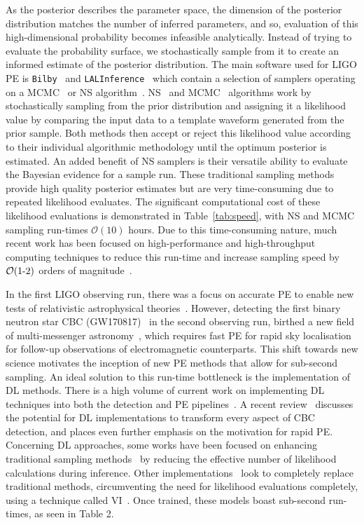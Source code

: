 \documentclass[a4paper]{jpconf}
\begin{document}
As the posterior describes the parameter space, the dimension of the posterior distribution matches the number of inferred parameters, and so, evaluation of this high-dimensional probability becomes infeasible analytically. Instead of trying to evaluate the probability surface, we stochastically sample from it to create an informed estimate of the posterior distribution. The main software used for LIGO PE is \texttt{Bilby}~\cite{bilby} and \texttt{LALInference}~\cite{lalinference} which contain a selection of samplers operating on a \ac{MCMC}~\cite{emcee,ptemcee} or \ac{NS} algorithm~\cite{dynesty,cpnest}. NS~\cite{Skilling2004} and MCMC~\cite{Metropolis1953,Hastings1970,Hogg} algorithms work by stochastically sampling from the prior distribution and assigning it a likelihood value by comparing the input data to a template waveform generated from the prior sample. Both methods then accept or reject this likelihood value according to their individual algorithmic methodology until the optimum posterior is estimated. An added benefit of NS samplers is their versatile ability to evaluate the Bayesian evidence for a sample run. These traditional sampling methods provide high quality posterior estimates but are very time-consuming due to repeated likelihood evaluates. The significant computational cost of these likelihood evaluations is demonstrated in Table~\ref{tab:speed}, with NS and MCMC sampling run-times $\mathcal{O}(10)$ hours. Due to this time-consuming nature, much recent work has been focused on high-performance and high-throughput computing techniques to reduce this run-time and increase sampling speed by $\mathcal{O}(1\textup{-}2)$ orders of magnitude~\cite{smith,purrer,gpu_inference,gpu_rit,2016PhRvD..94d4031S,2019PhRvD..99h4026W,2019PhRvD.100d3030T}. 

In the first LIGO observing run, there was a focus on accurate PE to enable new tests of relativistic astrophysical theories~\cite{GW170817_Hubble,GW150914_gr,Schutz}. However, detecting the first binary neutron star CBC (GW170817)~\cite{GW170817_properties} in the second observing run, birthed a new field of multi-messenger astronomy~\cite{GW170817_mma}, which requires fast PE for rapid sky localisation for follow-up observations of electromagnetic counterparts. This shift towards new science motivates the inception of new PE methods that allow for sub-second sampling. An ideal solution to this run-time bottleneck is the implementation of \ac{DL} methods. There is a high volume of current work on implementing DL techniques into both the detection and PE pipelines~\cite{PhysRevLett.120.141103}. A recent review~\cite{mlreview2020} discusses the potential for DL implementations to transform every aspect of CBC detection, and places even further emphasis on the motivation for rapid PE. Concerning \ac{DL} approaches, some works have been focused on enhancing traditional sampling methods~\cite{williams2021nested} by reducing the effective number of likelihood calculations during inference. Other implementations~\cite{stephengreen2020,vitpaper} look to completely replace traditional methods, circumventing the need for likelihood evaluations completely, using a technique called \ac{VI}~\cite{1904.06264}. Once trained, these models boast sub-second run-times, as seen in Table 2.
\end{document}
